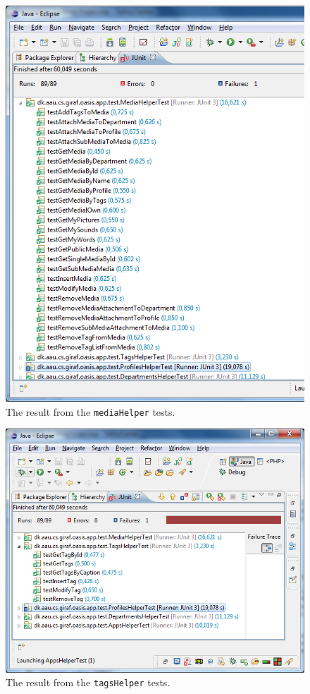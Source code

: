 \begin{figure}[htbp]
	\centering
		\includegraphics[width=\textwidth]{Images/unit_testing/media_helper_tests.PNG}
	\caption{The result from the \texttt{mediaHelper} tests.}
	\label{fig:media_helper_tests}
\end{figure}

\begin{figure}[htbp]
	\centering
		\includegraphics[width=\textwidth]{Images/unit_testing/tag_helper_tests.PNG}
	\caption{The result from the \texttt{tagsHelper} tests.}
	\label{fig:tag_helper_tests}
\end{figure}

